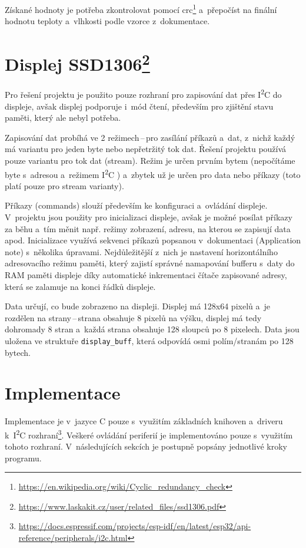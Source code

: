 \documentclass[a4paper, 12pt]{article}
\newcommand{\iic}{I\textsuperscript{2}C }
\begin{document}
Získané hodnoty je potřeba zkontrolovat pomocí crc\footnote{\url{https://en.wikipedia.org/wiki/Cyclic\_redundancy\_check}} a~přepočíst na finální hodnotu teploty a~vlhkosti podle vzorce z~dokumentace.

\section[Displej SSD1306]{Displej SSD1306\protect\footnote{\url{https://www.laskakit.cz/user/related\_files/ssd1306.pdf}}}\label{ssd1306}
Pro řešení projektu je použito pouze rozhraní pro zapisování dat přes \iic do displeje, avšak displej podporuje i~mód čtení, především pro zjištění stavu paměti, který ale nebyl potřeba.

Zapisování dat probíhá ve 2 režimech\,--\,pro zasílání příkazů a~dat, z~nichž každý má variantu pro jeden byte nebo nepřetržitý tok dat. Řešení projektu používá pouze variantu pro tok dat (stream). Režim je určen prvním bytem (nepočítáme byte s~adresou a~režimem \iic) a~zbytek už je určen pro data nebo příkazy (toto platí pouze pro stream varianty).

Příkazy (commands) slouží především ke konfiguraci a~ovládání displeje. V~projektu jsou použity pro inicializaci displeje, avšak je možné posílat příkazy za běhu a~tím měnit např. režimy zobrazení, adresu, na kterou se zapisují data apod. Inicializace využívá sekvenci příkazů popsanou v~dokumentaci (Application note) s~několika úpravami. Nejdůležitější z~nich je nastavení horizontálního adresovacího režimu paměti, který zajistí správné namapování bufferu s~daty do RAM paměti displeje díky automatické inkrementaci čítače zapisované adresy, která se zalamuje na konci řádků displeje.

Data určují, co bude zobrazeno na displeji. Displej má 128x64 pixelů a~je rozdělen na strany\,--\,strana obsahuje 8 pixelů na výšku, displej má tedy dohromady 8 stran a~každá strana obsahuje 128 sloupců po 8 pixelech. Data jsou uložena ve struktuře \texttt{display\_buff}, která odpovídá osmi polím/stranám po 128 bytech.

\section{Implementace}
Implementace je v~jazyce C pouze s~využitím základních knihoven a~driveru k~\iic rozhraní\footnote{\url{https://docs.espressif.com/projects/esp-idf/en/latest/esp32/api-reference/peripherals/i2c.html}}. Veškeré ovládání periferií je implementováno pouze s~využitím tohoto rozhraní. V~následujících sekcích je postupně popsány jednotlivé kroky programu.
\end{document}
